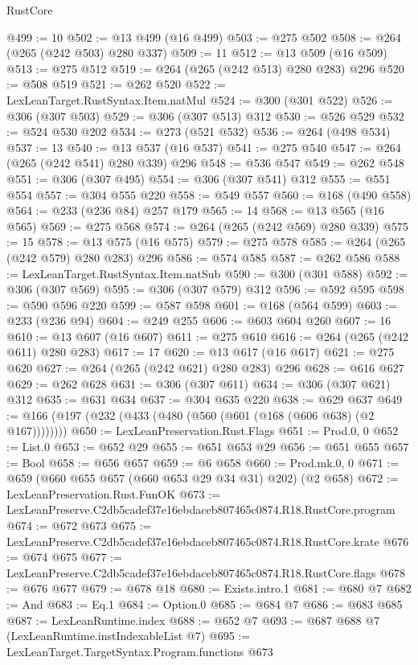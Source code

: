\begin{lexlean}{RustCore}
\begin{coremodule}
@499 := 10
@502 := @13 @499 (@16 @499)
@503 := @275 @502
@508 := @264 (@265 (@242 @503) @280 @337)
@509 := 11
@512 := @13 @509 (@16 @509)
@513 := @275 @512
@519 := @264 (@265 (@242 @513) @280 @283) @296
@520 := @508 @519
@521 := @262 @520
@522 := LexLeanTarget.RustSyntax.Item.natMul
@524 := @300 (@301 @522)
@526 := @306 (@307 @503)
@529 := @306 (@307 @513) @312
@530 := @526 @529
@532 := @524 @530 @202
@534 := @273 (@521 @532)
@536 := @264 (@498 @534)
@537 := 13
@540 := @13 @537 (@16 @537)
@541 := @275 @540
@547 := @264 (@265 (@242 @541) @280 @339) @296
@548 := @536 @547
@549 := @262 @548
@551 := @306 (@307 @495)
@554 := @306 (@307 @541) @312
@555 := @551 @554
@557 := @304 @555 @220
@558 := @549 @557
@560 := @168 (@490 @558)
@564 := @233 (@236 @84) @257 @179
@565 := 14
@568 := @13 @565 (@16 @565)
@569 := @275 @568
@574 := @264 (@265 (@242 @569) @280 @339)
@575 := 15
@578 := @13 @575 (@16 @575)
@579 := @275 @578
@585 := @264 (@265 (@242 @579) @280 @283) @296
@586 := @574 @585
@587 := @262 @586
@588 := LexLeanTarget.RustSyntax.Item.natSub
@590 := @300 (@301 @588)
@592 := @306 (@307 @569)
@595 := @306 (@307 @579) @312
@596 := @592 @595
@598 := @590 @596 @220
@599 := @587 @598
@601 := @168 (@564 @599)
@603 := @233 (@236 @94)
@604 := @249 @255
@606 := @603 @604 @260
@607 := 16
@610 := @13 @607 (@16 @607)
@611 := @275 @610
@616 := @264 (@265 (@242 @611) @280 @283)
@617 := 17
@620 := @13 @617 (@16 @617)
@621 := @275 @620
@627 := @264 (@265 (@242 @621) @280 @283) @296
@628 := @616 @627
@629 := @262 @628
@631 := @306 (@307 @611)
@634 := @306 (@307 @621) @312
@635 := @631 @634
@637 := @304 @635 @220
@638 := @629 @637
@649 := @166 (@197 (@232 (@433 (@480 (@560 (@601 (@168 (@606 @638) (@2 @167))))))))
@650 := LexLeanPreservation.Rust.Flags
@651 := Prod.{0, 0}
@652 := List.{0}
@653 := @652 @29
@655 := @651 @653 @29
@656 := @651 @655
@657 := Bool
@658 := @656 @657
@659 := @6 @658
@660 := Prod.mk.{0, 0}
@671 := @659 (@660 @655 @657 (@660 @653 @29 @34 @31) @202) (@2 @658)
@672 := LexLeanPreservation.Rust.FunOK
@673 := LexLeanPreserve.C2db5cadef37e16ebdaceb807465c0874.R18.RustCore.program
@674 := @672 @673
@675 := LexLeanPreserve.C2db5cadef37e16ebdaceb807465c0874.R18.RustCore.krate
@676 := @674 @675
@677 := LexLeanPreserve.C2db5cadef37e16ebdaceb807465c0874.R18.RustCore.flags
@678 := @676 @677
@679 := @678 @18
@680 := Exists.intro.{1}
@681 := @680 @7
@682 := And
@683 := Eq.{1}
@684 := Option.{0}
@685 := @684 @7
@686 := @683 @685
@687 := LexLeanRuntime.index
@688 := @652 @7
@693 := @687 @688 @7 (LexLeanRuntime.instIndexableList @7)
@695 := LexLeanTarget.TargetSyntax.Program.functions @673

\end{coremodule}
\end{lexlean}
